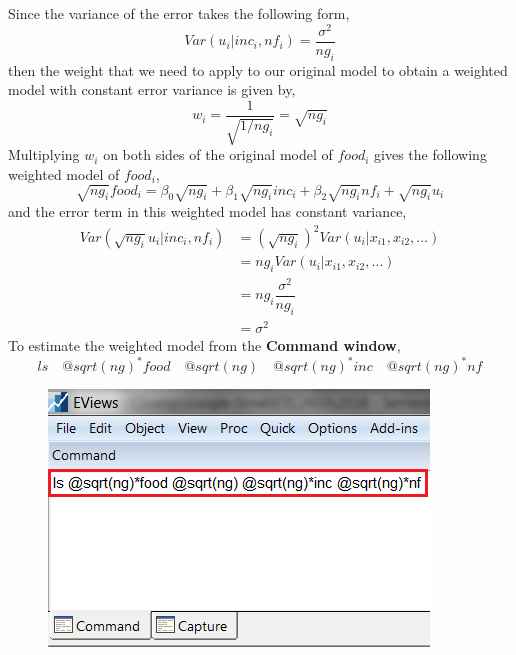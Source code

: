 \documentclass[12pt]{report}
\begin{document}
\noindent Since the variance of the error takes the following form,
$$Var(u_i|inc_i,nf_i)=\dfrac{\sigma^2}{ng_i}$$
\noindent then the weight that we need to apply to our original model to obtain a weighted model with constant error variance is given by,
$$w_i = \dfrac{1}{\sqrt{1/ng_i}} = \sqrt{ng_i}$$
\noindent Multiplying $w_i$ on both sides of the original model of $food_i$ gives the following weighted model of $food_i$,
$$\sqrt{ng_i}food_i = \beta_0\sqrt{ng_i} + \beta_1\sqrt{ng_i}inc_i + \beta_2\sqrt{ng_i}nf_i + \sqrt{ng_i}u_i$$
\noindent and the error term in this weighted model has constant variance,
\begin{align*}
	Var(\sqrt{ng_i}u_i|inc_i,nf_i) &= (\sqrt{ng_i})^2Var(u_i|x_{i1},x_{i2},\dots) \\
	&= ng_iVar(u_i|x_{i1},x_{i2},\dots) \\
	&= ng_i\dfrac{\sigma^2}{ng_i} \\
	&= \sigma^2
\end{align*}
\noindent To estimate the weighted model from the \textbf{Command window},
$$ls \quad @sqrt(ng)^*food \quad @sqrt(ng) \quad @sqrt(ng)^*inc \quad @sqrt(ng)^*nf$$
\begin{figure}[H]
	\centering
	\includegraphics{tute10_4}
\end{figure}
\vspace{-\baselineskip}
\end{document}
